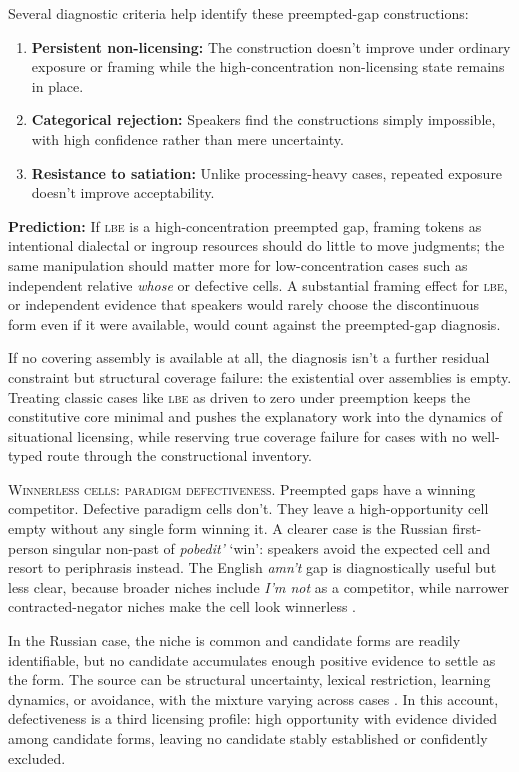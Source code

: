 \documentclass[12pt,letterpaper]{article}
\newcommand{\mention}[1]{\textit{#1}}
\newcommand{\olang}[1]{\textit{#1}}
\newcommand{\abbr}[1]{\textsc{#1}}
\begin{document}
Several diagnostic criteria help identify these preempted-gap constructions:
\begin{enumerate}
\item \textbf{Persistent non-licensing:} The construction doesn't improve under ordinary exposure or framing while the high-concentration non-licensing state remains in place.
\item \textbf{Categorical rejection:} Speakers find the constructions simply impossible, with high confidence rather than mere uncertainty.
\item \textbf{Resistance to satiation:} Unlike processing-heavy cases, repeated exposure doesn't improve acceptability.
\end{enumerate}

\textbf{Prediction:} If \abbr{lbe} is a high-concentration preempted gap,
framing tokens as intentional dialectal or ingroup resources should do little to
move judgments; the same manipulation should matter more for low-concentration
cases such as independent relative \mention{whose} or defective cells. A
substantial framing effect for \abbr{lbe}, or independent evidence that speakers
would rarely choose the discontinuous form even if it were available, would
count against the preempted-gap diagnosis.

If no covering assembly is available at all, the diagnosis isn't a further residual constraint but structural coverage failure: the existential over assemblies is empty. Treating classic cases like \abbr{lbe} as driven to zero under preemption keeps the constitutive core minimal and pushes the explanatory work into the dynamics of situational licensing, while reserving true coverage failure for cases with no well-typed route through the constructional inventory.

\noindent\textsc{Winnerless cells: paradigm defectiveness.} Preempted gaps have a winning competitor. Defective paradigm
cells don't. They leave a high-opportunity cell empty without any single form
winning it. A clearer case is the Russian first-person singular non-past of
\olang{pobedit'} `win': speakers avoid the expected cell and resort to
periphrasis instead. The English \mention{amn't} gap is diagnostically useful but
less clear, because broader niches include \mention{I'm not} as a competitor,
while narrower contracted-negator niches make the cell look winnerless
\citep{Broadbent2009Amnt,ThomsEtAl2025Amnt,Sims2023Defectiveness,
Pertsova2016RussianGaps,PertsovaKuznetsova2015Russian}.

In the Russian case, the niche is common and candidate forms are readily identifiable, but no candidate
accumulates enough positive evidence to settle as the form. The source can be
structural uncertainty, lexical restriction, learning dynamics, or avoidance,
with the mixture varying across cases \citep{Sims2023Defectiveness}. In this
account, defectiveness is a third licensing profile: high opportunity with
evidence divided among candidate forms, leaving no candidate stably established
or confidently excluded.
\end{document}
